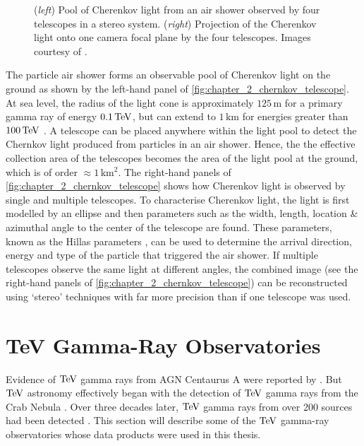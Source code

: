 \begin{figure}[h]
    \caption{(\textit{left}) Pool of Cherenkov light from an air shower observed by four telescopes in a stereo system.
    (\textit{right}) Projection of the Cherenkov light onto one camera focal plane by the four telescopes. Images courtesy of \cite{2009ExA....25..173V,}.}
    \label{fig:chapter_2_chernkov_telescope}
\end{figure}
\newpar
The particle air shower forms an observable pool of Cherenkov light on the ground as shown by the left-hand panel of \autoref{fig:chapter_2_chernkov_telescope}. At sea level, the radius of the light cone is approximately $125\,\si{\meter}$ for a primary gamma ray of energy $0.1\,\TeV$, but can extend to $1\,\si{\kilo\meter}$ for energies greater than $100\,\TeV$ \citep{Patterson_1983}.  A telescope can be placed anywhere within the light pool to detect the Chernkov light produced from particles in an air shower. Hence, the the effective collection area of the telescopes becomes the area of the light pool at the ground, which is of order $\approx1\,\si{\kilo\meter\squared}$.
\newpar
The right-hand panels of \autoref{fig:chapter_2_chernkov_telescope} shows how Cherenkov light is observed by single and multiple telescopes. To characterise Cherenkov light, the light is first modelled by an ellipse and then parameters such as the width, length, location \& azimuthal angle to the center of the telescope are found. These parameters, known as the Hillas parameters \citep{1985ICRC....3..445H}, can be used to determine the arrival direction, energy and type of the particle that triggered the air shower. If multiple telescopes observe the same light at different angles, the combined image (see the right-hand panels of \autoref{fig:chapter_2_chernkov_telescope}) can be reconstructed using `stereo' techniques with far more precision than if one telescope was used.

\section{TeV Gamma-Ray Observatories} \label{sec:02_TeV_observatories}

Evidence of $\TeV$ gamma rays from AGN Centaurus A were reported by \cite{1975ApJ...197L...9G}. But $\TeV$ astronomy effectively began with the detection of $\TeV$ gamma rays from the Crab Nebula \citep{1989ApJ...342..379W}. Over three decades later, $\TeV$ gamma rays from over 200 sources had been detected \citep{2008ICRC....3.1341W}. This section will describe some of the $\TeV$ gamma-ray observatories whose data products were used in this thesis.

